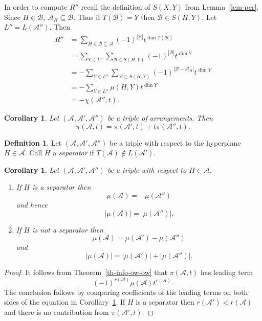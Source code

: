 \documentclass{article}
\newtheorem{cor}[thm]{Corollary}
\theoremstyle{definition}
\newtheorem{defn}{Definition}[section]
\theoremstyle{remark}
\newcommand{\thmref}[1]{Theorem~\ref{#1}}
\newcommand{\lemref}[1]{Lemma~\ref{#1}}
\newcommand{\A}{\mathcal{A}}
\newcommand{\B}{\mathcal{B}}
\newcommand{\envert}[1]{\left\lvert#1\right\rvert}
\let\abs=\envert
\begin{document}
In order to compute $R''$ recall the definition
of $S(X,Y)$ from \lemref{lem-per}. Since $H \in \B$,
$\A_{H} \subseteq \B$. Thus if $T(\B) = Y$ then
$\B \in S(H,Y)$. Let $L'' = L(\A'')$. Then
\begin{equation}\label{E_SXgYy}
\begin{split}
R''&= \sum_{H\in \B \subseteq \A} (-1)^{\abs{\B}}
t^{\dim T(\B)}\\
&= \sum_{Y \in L''} \sum_{\B \in S(H,Y)}
(-1)^{\abs{\B}}t^{\dim Y} \\
&= -\sum_{Y \in L''} \sum_{\B \in S(H,Y)} (-1)^
{\abs{\B - \A_{H}}} t^{\dim Y} \\
&= -\sum_{Y \in L''} \mu (H,Y)t^{\dim Y} \\
&= -\chi (\A '',t).
\end{split}
\end{equation}

\begin{cor}\label{tripleA}
Let $(\A,\A',\A'')$ be a triple of arrangements. Then
\[ \pi (\A,t) = \pi (\A',t) + t \pi (\A'',t). \]
\end{cor}

\begin{defn}
Let $(\A,\A',\A'')$ be a triple with respect to
the hyperplane $H \in \A$. Call $H$ a \textit{separator}
if $T(\A) \not\in L(\A')$.
\end{defn}

\begin{cor}\label{nsep}
Let $(\A,\A',\A'')$ be a triple with respect to $H \in \A$.
\begin{enumerate}
\renewcommand{\labelenumi}{(\roman{enumi})}
\item
If $H$ is a separator then
\[ \mu (\A) = - \mu (\A'') \]
and hence
\[ \abs{\mu (\A)} = \abs{ \mu (\A'')}. \]

\item If $H$ is not a separator then
\[\mu (\A) = \mu (\A') - \mu (\A'') \]
and
\[ \abs{\mu (\A)} = \abs{\mu (\A')} + \abs{\mu (\A'')}. \]
\end{enumerate}
\end{cor}

\begin{proof}
It follows from \thmref{th-info-ow-ow} that $\pi(\A,t)$
has leading term
\[(-1)^{r(\A)}\mu (\A)t^{r(\A)}.\]
The conclusion
follows by comparing coefficients of the leading
terms on both sides of the equation in
Corollary~\ref{tripleA}. If $H$ is a separator then
$r(\A') < r(\A)$ and there is no contribution
from $\pi (\A',t)$.
\end{proof}
\end{document}
